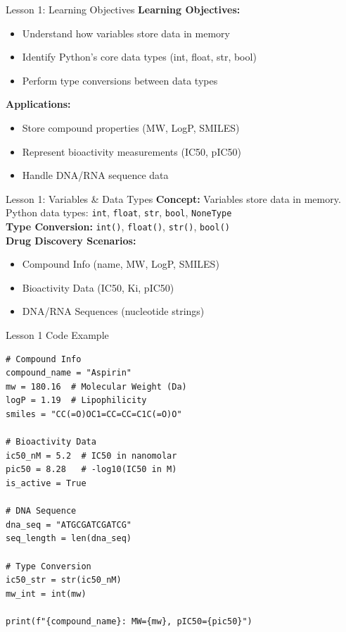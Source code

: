 \documentclass{beamer}
\begin{document}
\begin{frame}{Lesson 1: Learning Objectives}
    \small
    \textbf{Learning Objectives:}
    \begin{itemize}
        \item Understand how variables store data in memory
        \item Identify Python's core data types (int, float, str, bool)
        \item Perform type conversions between data types
    \end{itemize}
    \vspace{0.5em}
    \textbf{Applications:}
    \begin{itemize}
        \item Store compound properties (MW, LogP, SMILES)
        \item Represent bioactivity measurements (IC50, pIC50)
        \item Handle DNA/RNA sequence data
    \end{itemize}
\end{frame}

\begin{frame}{Lesson 1: Variables \& Data Types}
    \small
    \textbf{Concept:} Variables store data in memory.\\[0.5em]
    Python data types: \texttt{int}, \texttt{float}, \texttt{str}, \texttt{bool}, \texttt{NoneType}\\[0.5em]
    \textbf{Type Conversion:} \texttt{int()}, \texttt{float()}, \texttt{str()}, \texttt{bool()}\\[0.5em]
    \textbf{Drug Discovery Scenarios:}
    \begin{itemize}
        \item Compound Info (name, MW, LogP, SMILES)
        \item Bioactivity Data (IC50, Ki, pIC50)
        \item DNA/RNA Sequences (nucleotide strings)
    \end{itemize}
\end{frame}

\begin{frame}[fragile]{Lesson 1 Code Example}
    \small
    \begin{lstlisting}[style=codeStyle]
# Compound Info
compound_name = "Aspirin"
mw = 180.16  # Molecular Weight (Da)
logP = 1.19  # Lipophilicity
smiles = "CC(=O)OC1=CC=CC=C1C(=O)O"

# Bioactivity Data
ic50_nM = 5.2  # IC50 in nanomolar
pic50 = 8.28   # -log10(IC50 in M)
is_active = True

# DNA Sequence
dna_seq = "ATGCGATCGATCG"
seq_length = len(dna_seq)

# Type Conversion
ic50_str = str(ic50_nM)
mw_int = int(mw)

print(f"{compound_name}: MW={mw}, pIC50={pic50}")
    \end{lstlisting}
\end{frame}
\end{document}
